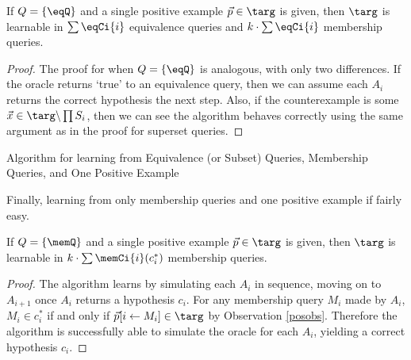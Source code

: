 \begin{proposition}
If $Q = \{\eqQ\}$ and a single positive example $\vec{p} \in \targ$ is given, then $\targ$ is learnable in $\sum \eqCi{i}$ equivalence queries and $k \cdot \sum \eqCi{i}$ membership queries. 
\end{proposition}
\begin{proof}
The proof for when  $Q = \{\eqQ\}$ is analogous, with only two differences. 
If the oracle returns `true' to an equivalence query, then we can assume each $A_i$ returns the correct hypothesis the next step. 
Also, if the counterexample is some $\vec{x} \in \targ \backslash \prod S_i$, then we can see the algorithm behaves correctly using the same argument as in the proof for superset queries.
\end{proof}


\begin{algorithm}[H]
\label{lineqalg}
\SetAlgoLined
{}
\caption{Algorithm for learning from Equivalence (or Subset)  Queries, Membership Queries, and One Positive Example}
\end{algorithm}


Finally, learning from only membership queries and one positive example if fairly easy. 

\begin{proposition}
If $Q = \{\memQ\}$ and a single positive example $\vec{p} \in \targ$ is given, then $\targ$ is learnable in $k \cdot \sum \memCi{i}(c^*_i)$ membership queries. 
\end{proposition}
\begin{proof}
The algorithm learns by simulating each $A_i$ in sequence, moving on to $A_{i+1}$ once $A_i$ returns a hypothesis $c_i$. 
For any membership query $M_i$ made by $A_i$, $M_i \in c^*_i$ if and only if $\vec{p}[i \leftarrow M_i]\in \targ$ by Observation \ref{posobs}. 
Therefore the algorithm is successfully able to simulate the oracle for each $A_i$, yielding a correct hypothesis $c_i$. 
\end{proof}
